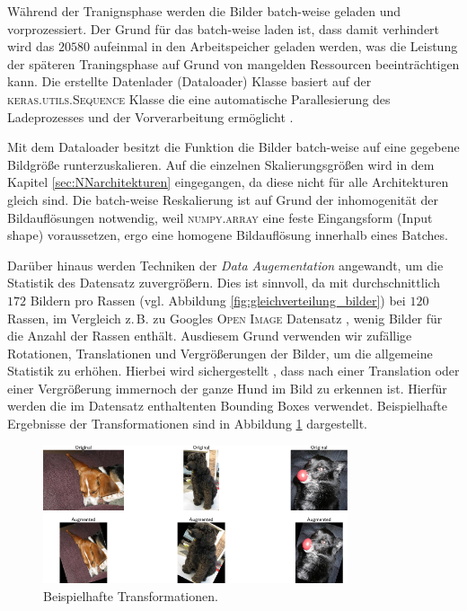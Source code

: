 Während der Tranignsphase werden die Bilder batch-weise geladen und vorprozessiert.
Der Grund für das batch-weise laden ist, dass damit verhindert wird das $20580$
aufeinmal in den Arbeitspeicher geladen werden, was die Leistung der späteren
Traningsphase auf Grund von mangelden Ressourcen beeinträchtigen kann. Die erstellte
Datenlader (Dataloader) Klasse basiert auf der \textsc{keras.utils.Sequence} Klasse die eine
automatische Parallesierung des Ladeprozesses und der Vorverarbeitung ermöglicht
\cite{keras_sequentiel}.

Mit dem Dataloader besitzt die Funktion die Bilder batch-weise auf eine gegebene
Bildgröße runterzuskalieren. Auf die einzelnen Skalierungsgrößen wird in dem
Kapitel \ref{sec:NNarchitekturen} eingegangen, da diese nicht für alle Architekturen
gleich sind. Die batch-weise Reskalierung ist auf Grund der inhomogenität
der Bildauflösungen notwendig, weil \textsc{numpy.array}
eine feste Eingangsform (Input shape) voraussetzen, ergo eine homogene Bildauflösung
innerhalb eines Batches.

Darüber hinaus werden Techniken der \emph{Data Augementation} angewandt, um
die Statistik des Datensatz zuvergrößern. Dies ist sinnvoll, da mit durchschnittlich
$172$ Bildern pro Rassen (vgl. Abbildung \ref{fig:gleichverteilung_bilder})
bei $120$ Rassen, im Vergleich z.\,B. zu Googles \textsc{Open Image} Datensatz
\cite{google_open_image}, wenig Bilder für die Anzahl der Rassen enthält.
Ausdiesem Grund verwenden wir zufällige Rotationen, Translationen und Vergrößerungen
der Bilder, um die allgemeine Statistik zu erhöhen. Hierbei wird sichergestellt
, dass nach einer Translation oder einer Vergrößerung immernoch der ganze Hund
im Bild zu erkennen ist. Hierfür werden die im Datensatz enthaltenten Bounding
Boxes verwendet. Beispielhafte Ergebnisse der Transformationen sind in Abbildung
\ref{fig:data_augementation} dargestellt.
\begin{figure}
\centering
\includegraphics[width=0.8\textwidth]{../../final_data/general/data_augementation.pdf}
\caption{Beispielhafte Transformationen.}
\label{fig:data_augementation}
\end{figure}

